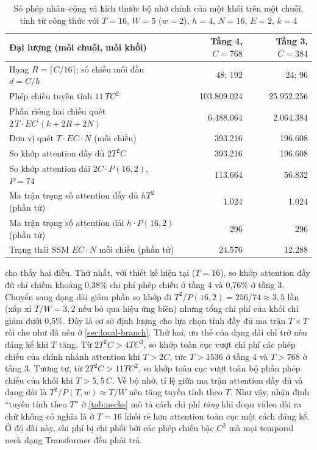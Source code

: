 \begin{table}[htbp]
\centering
\caption{Số phép nhân--cộng và kích thước bộ nhớ chính của một khối trên một chuỗi, tính từ công thức với $T = 16$, $W = 5$ ($w = 2$), $h = 4$, $N = 16$, $E = 2$, $k = 4$}
\label{tab:flops}
\small
\begin{tabularx}{\textwidth}{Xrr}
\toprule
\textbf{Đại lượng (mỗi chuỗi, mỗi khối)} & \textbf{Tầng 4, $C = 768$} & \textbf{Tầng 3, $C = 384$}\\
\midrule
Hạng $R = \lceil C/16 \rceil$; số chiều mỗi đầu $d = C/h$ & 48; 192 & 24; 96\\
Phép chiếu tuyến tính $11\,TC^2$ & 103.809.024 & 25.952.256\\
Phần riêng hai chiều quét $2\,T \cdot EC\,(k + 2R + 2N)$ & 6.488.064 & 2.064.384\\
Đơn vị quét $T \cdot EC \cdot N$ (mỗi chiều) & 393.216 & 196.608\\
So khớp attention đầy đủ $2T^2C$ & 393.216 & 196.608\\
So khớp attention dải $2C \cdot P(16, 2)$, $P = 74$ & 113.664 & 56.832\\
\midrule
Ma trận trọng số attention đầy đủ $hT^2$ (phần tử) & 1.024 & 1.024\\
Ma trận trọng số attention dải $h \cdot P(16, 2)$ (phần tử) & 296 & 296\\
Trạng thái SSM $EC \cdot N$ mỗi chiều (phần tử) & 24.576 & 12.288\\
\bottomrule
\end{tabularx}
\end{table}

 cho thấy hai điều. Thứ nhất, với thiết kế hiện tại ($T = 16$), so khớp attention đầy đủ chỉ chiếm khoảng 0,38\% chi phí phép chiếu ở tầng 4 và 0,76\% ở tầng 3. Chuyển sang dạng dải giảm phần so khớp đi $T^2 / P(16, 2) = 256/74 \approx 3{,}5$ lần (xấp xỉ $T/W = 3{,}2$ nếu bỏ qua hiệu ứng biên) nhưng tổng chi phí của khối chỉ giảm dưới 0,5\%. Đây là cơ sở định lượng cho lựa chọn tính đầy đủ ma trận $T \times T$ rồi che như đã nêu ở \cref{sec:local-branch}. Thứ hai, ưu thế của dạng dải chỉ trở nên đáng kể khi $T$ tăng. Từ $2T^2C > 4TC^2$, so khớp toàn cục vượt chi phí các phép chiếu của chính nhánh attention khi $T > 2C$, tức $T > 1536$ ở tầng 4 và $T > 768$ ở tầng 3. Tương tự, từ $2T^2C > 11TC^2$, so khớp toàn cục vượt toàn bộ phần phép chiếu của khối khi $T > 5{,}5\,C$. Về bộ nhớ, tỉ lệ giữa ma trận attention đầy đủ và dạng dải là $T^2/P(T, w) \approx T/W$ nên tăng tuyến tính theo $T$. Như vậy, nhận định ``tuyến tính theo $T$'' ở \cref{tab:necks} mô tả cách chi phí \emph{tăng} khi đoạn video dài ra chứ không có nghĩa là ở $T = 16$ khối rẻ hơn attention toàn cục một cách đáng kể. Ở độ dài này, chi phí bị chi phối bởi các phép chiếu bậc $C^2$ mà mọi temporal neck dạng Transformer đều phải trả.

